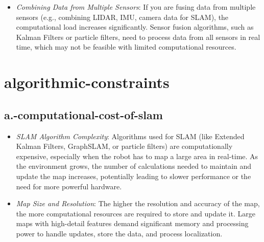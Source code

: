 \documentclass[../../main]{subfiles}
\begin{document}
    \begin{itemize}
    \item
      \emph{Combining Data from Multiple Sensors}: If you are fusing data
      from multiple sensors (e.g., combining LIDAR, IMU, camera data for
      SLAM), the computational load increases significantly. Sensor fusion
      algorithms, such as Kalman Filters or particle filters, need to
      process data from all sensors in real time, which may not be feasible
      with limited computational resources.
    \end{itemize}
    
    \section{algorithmic-constraints}
    
    \subsection{a.-computational-cost-of-slam}

    \begin{itemize}
    \item
      \emph{SLAM Algorithm Complexity}: Algorithms used for SLAM (like
      Extended Kalman Filters, GraphSLAM, or particle filters) are
      computationally expensive, especially when the robot has to map a
      large area in real-time. As the environment grows, the number of
      calculations needed to maintain and update the map increases,
      potentially leading to slower performance or the need for more
      powerful hardware.
    \item
      \emph{Map Size and Resolution}: The higher the resolution and
      accuracy of the map, the more computational resources are required to
      store and update it. Large maps with high-detail features demand
      significant memory and processing power to handle updates, store the
      data, and process localization.
    \end{itemize}
    
\end{document}
